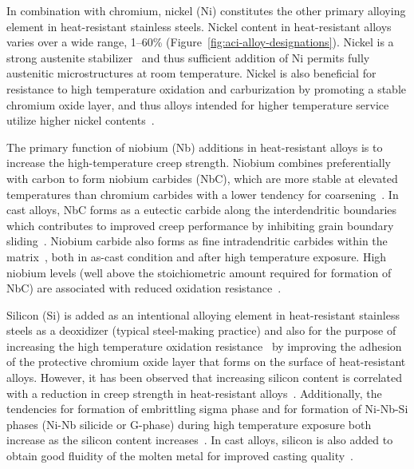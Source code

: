 In combination with chromium, nickel (Ni) constitutes the other primary alloying element in heat-resistant stainless steels. Nickel content in heat-resistant alloys varies over a wide range, \numrange[range-phrase=--]{1}{60}\% (Figure~\ref{fig:aci-alloy-designations}). Nickel is a strong austenite stabilizer~\cite{folkhard_welding_1988} and thus sufficient addition of Ni permits fully austenitic microstructures at room temperature. Nickel is also beneficial for resistance to high temperature oxidation and carburization by promoting a stable chromium oxide layer, and thus alloys intended for higher temperature service utilize higher nickel contents~\cite{kane_evolution_1991}.

The primary function of niobium (Nb) additions in heat-resistant alloys is to increase the high-temperature creep strength. Niobium combines preferentially with carbon to form niobium carbides (NbC), which are more stable at elevated temperatures than chromium carbides with a lower tendency for coarsening~\cite{keown_niobium_1981}. In cast alloys, NbC forms as a eutectic carbide along the interdendritic boundaries~\cite{davis_metallurgy_1994} which contributes to improved creep performance by inhibiting grain boundary sliding~\cite{de_almeida_soares_niobium_1992-1}. Niobium carbide also forms as fine intradendritic carbides within the matrix~\cite{chen_characterisation_2004}, both in as-cast condition and after high temperature exposure. High niobium levels (well above the stoichiometric amount required for formation of NbC) are associated with reduced oxidation resistance~\cite{collins_effect_1980}.

Silicon (Si) is added as an intentional alloying element in heat-resistant stainless steels as a deoxidizer (typical steel-making practice) and also for the purpose of increasing the high temperature oxidation resistance~\cite{kane_evolution_1991} by improving the adhesion of the protective chromium oxide layer that forms on the surface of heat-resistant alloys. However, it has been observed that increasing silicon content is correlated with a reduction in creep strength in heat-resistant alloys~\cite{avery_cast_1969}. Additionally, the tendencies for formation of embrittling sigma phase and for formation of Ni-Nb-Si phases (Ni-Nb silicide or G-phase) during high temperature exposure both increase as the silicon content increases~\cite{pedro_ibanez_effects_1993,davis_metallurgy_1994}. In cast alloys, silicon is also added to obtain good fluidity of the molten metal for improved casting quality~\cite{blair_cast_stainless_1990}.

